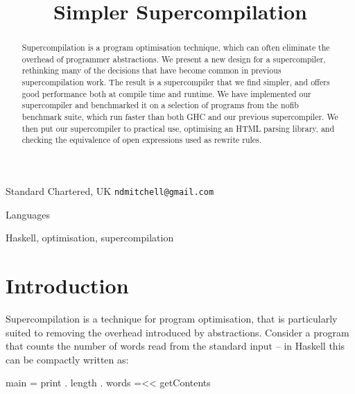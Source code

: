 \documentclass{sigplanconf}
\begin{document}

\titlebanner{\today{} - \currenttime{}}        %
\preprintfooter{}   %

\title{Simpler Supercompilation}

           {Standard Chartered, UK}
           {\verb"ndmitchell@gmail.com"}

\maketitle

\begin{abstract}
Supercompilation is a program optimisation technique, which can often eliminate the overhead of programmer abstractions. We present a new design for a supercompiler, rethinking many of the decisions that have become common in previous supercompilation work. The result is a supercompiler that we find simpler, and offers good performance both at compile time and runtime. We have implemented our supercompiler and benchmarked it on a selection of programs from the nofib benchmark suite, which run faster than both GHC and our previous supercompiler. We then put our supercompiler to practical use, optimising an HTML parsing library, and checking the equivalence of open expressions used as rewrite rules.
\end{abstract}


\terms
Languages

\keywords
Haskell, optimisation, supercompilation

\section{Introduction}


Supercompilation is a technique for program optimisation, that is particularly suited to removing the overhead introduced by abstractions. Consider a program that counts the number of words read from the standard input -- in Haskell \cite{haskell} this can be compactly written as:

\begin{code}
main = print . length . words =<< getContents
\end{code}
\end{document}
